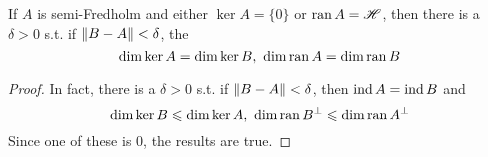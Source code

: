 \begin{prop}
	If $A$ is semi-Fredholm and either $\ker{A} = \{0\}$ or $\operatorname{ran}{A} = \mathscr{H}$, then there is a $\delta > 0$ s.t. if $\left\lVert B-A\right\lVert < \delta$, the 
	\begin{equation*}
		\dim{\ker{A}} = \dim{\ker{B}},~ \dim{\operatorname{ran}{A}} = \dim{\operatorname{ran}{B}}
	\end{equation*}
\end{prop}
\begin{proof}
	In fact, there is a $\delta > 0$ s.t. if $\left\lVert B-A\right\lVert < \delta$, then $\operatorname{ind}{A} = \operatorname{ind}{B}$ and 
	\begin{equation*}
		\dim{\ker{B}} \leqslant \dim{\ker{A}},~ \dim{\operatorname{ran}{B}^{\bot}} \leqslant \dim{\operatorname{ran}{A}^{\bot}}
	\end{equation*}
	Since one of these is $0$, the results are true.
\end{proof}

